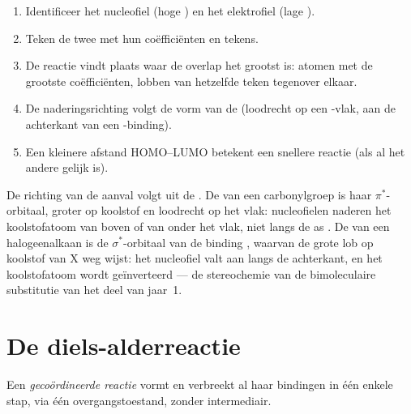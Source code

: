 \begin{method}\label{met:b2:frontier-orbitals:fmo}
\begin{enumerate}
  \item Identificeer het nucleofiel (hoge ) en het elektrofiel (lage ).
  \item Teken de twee  met hun coëfficiënten en tekens.
  \item De reactie vindt plaats waar de overlap het grootst is: atomen met de grootste
        coëfficiënten, lobben van hetzelfde teken tegenover elkaar.
  \item De naderingsrichting volgt de vorm van de  (loodrecht op een
        -vlak, aan de achterkant van een -binding).
  \item Een kleinere afstand HOMO--LUMO betekent een snellere reactie (als al het andere gelijk is).
\end{enumerate}
\end{method}

De richting van de aanval volgt uit de . De  van een carbonylgroep is haar
$\pi^*$-orbitaal, groter op koolstof en loodrecht op het vlak: nucleofielen naderen
het koolstofatoom van boven of van onder het vlak, niet langs de as . De  van een
halogeenalkaan is de $\sigma^*$-orbitaal van de binding , waarvan de grote lob op koolstof
van X weg wijst: het nucleofiel valt aan langs de achterkant, en het koolstofatoom wordt geïnverteerd
--- de stereochemie van de bimoleculaire substitutie van het deel van jaar~1.

\section{De diels-alderreactie}

\begin{definition}\label{def:b2:frontier-orbitals:concerted}
Een \emph{gecoördineerde reactie} vormt en verbreekt al haar bindingen in
één enkele stap, via één overgangstoestand, zonder intermediair.
\end{definition}

